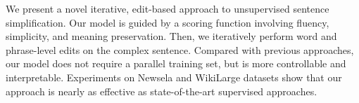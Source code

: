 We present a novel iterative, edit-based approach to unsupervised sentence simplification. Our model is guided by a scoring function involving fluency, simplicity, and meaning preservation. Then, we iteratively perform word and phrase-level edits on the complex sentence. Compared with previous approaches, our model does not require a parallel training set, but is more controllable and interpretable. Experiments on  Newsela and WikiLarge datasets show that our approach is nearly as effective as state-of-the-art supervised approaches.
